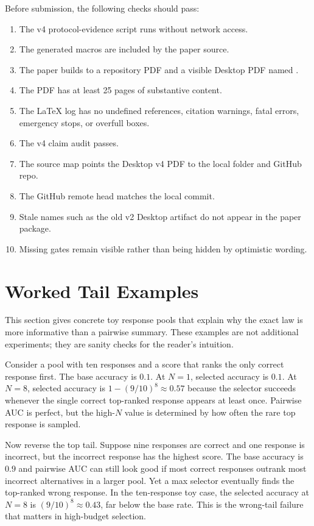 Before submission, the following checks should pass:
\begin{enumerate}[leftmargin=*]
\item The v4 protocol-evidence script runs without network access.
\item The generated macros are included by the paper source.
\item The paper builds to a repository PDF and a visible Desktop PDF named
.
\item The PDF has at least 25 pages of substantive content.
\item The LaTeX log has no undefined references, citation warnings, fatal
errors, emergency stops, or overfull boxes.
\item The v4 claim audit passes.
\item The source map points the Desktop v4 PDF to the local folder and GitHub
repo.
\item The GitHub remote head matches the local commit.
\item Stale names such as the old v2 Desktop artifact do not appear in the
paper package.
\item Missing gates remain visible rather than being hidden by optimistic
wording.
\end{enumerate}

\section{Worked Tail Examples}
\label{app:worked-tail}

This section gives concrete toy response pools that explain why the exact law
is more informative than a pairwise summary. These examples are not additional
experiments; they are sanity checks for the reader's intuition.

Consider a pool with ten responses and a score that ranks the only correct
response first. The base accuracy is $0.1$. At $N=1$, selected accuracy is
$0.1$. At $N=8$, selected accuracy is $1-(9/10)^8\approx0.57$ because the
selector succeeds whenever the single correct top-ranked response appears at
least once. Pairwise AUC is perfect, but the high-$N$ value is determined by
how often the rare top response is sampled.

Now reverse the top tail. Suppose nine responses are correct and one response
is incorrect, but the incorrect response has the highest score. The base
accuracy is $0.9$ and pairwise AUC can still look good if most correct
responses outrank most incorrect alternatives in a larger pool. Yet a max
selector eventually finds the top-ranked wrong response. In the ten-response
toy case, the selected accuracy at $N=8$ is $(9/10)^8\approx0.43$, far below
the base rate. This is the wrong-tail failure that matters in high-budget
selection.

